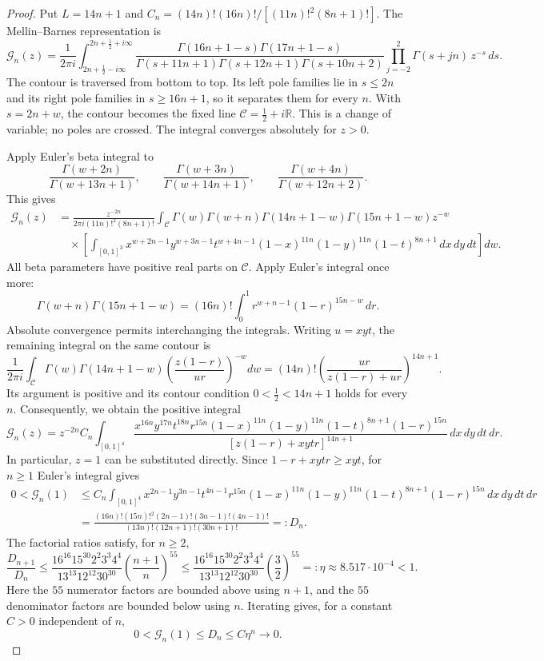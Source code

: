 \begin{proof}
Put $L=14n+1$ and $C_n=(14n)!(16n)!/[(11n)!^2(8n+1)!]$.
The Mellin--Barnes representation \cite[Eq.~16.17.1]{NIST:DLMF} is
\[
\mathcal{G}_n(z)=\frac{1}{2\pi i}
\int_{2n+\frac12-i\infty}^{2n+\frac12+i\infty}
\frac{
 \Gamma(16n+1-s)\Gamma(17n+1-s)
}{
 \Gamma(s+11n+1)\Gamma(s+12n+1)\Gamma(s+10n+2)
}\prod_{j=-2}^{2}\Gamma(s+jn)\,z^{-s}\,ds.
\]
The contour is traversed from bottom to top. Its left pole families
lie in $s\leq2n$ and its right pole families in $s\geq16n+1$,
so it separates them for every $n$.
With $s=2n+w$, the contour becomes the fixed line
$\mathcal C=\tfrac12+i\mathbb R$.
This is a change of variable; no poles are crossed.
The integral converges absolutely for $z>0$.

Apply Euler's beta integral \cite[Eq.~5.12.1]{NIST:DLMF} to
\[
\frac{\Gamma(w+2n)}{\Gamma(w+13n+1)},\qquad
\frac{\Gamma(w+3n)}{\Gamma(w+14n+1)},\qquad
\frac{\Gamma(w+4n)}{\Gamma(w+12n+2)}.
\]
This gives
\[
\begin{aligned}
\mathcal{G}_n(z)
&=\frac{z^{-2n}}{2\pi i(11n)!^2(8n+1)!}
\int_{\mathcal C}
\Gamma(w)\Gamma(w+n)\Gamma(14n+1-w)\Gamma(15n+1-w)z^{-w}\\
&\quad\times\left[\int_{[0,1]^3}
x^{w+2n-1}y^{w+3n-1}t^{w+4n-1}
(1-x)^{11n}(1-y)^{11n}(1-t)^{8n+1}
\,dx\,dy\,dt\right]dw.
\end{aligned}
\]
All beta parameters have positive real parts on $\mathcal C$.
Apply Euler's integral once more:
\[
\Gamma(w+n)\Gamma(15n+1-w)
=(16n)!\int_0^1 r^{w+n-1}(1-r)^{15n-w}\,dr.
\]
Absolute convergence permits interchanging the integrals.
Writing $u=xyt$, the remaining integral on the same contour is
\cite[Eq.~5.13.1]{NIST:DLMF}
\[
\frac{1}{2\pi i}\int_{\mathcal C}
\Gamma(w)\Gamma(14n+1-w)
\left(\frac{z(1-r)}{ur}\right)^{-w}dw
=(14n)!\left(\frac{ur}{z(1-r)+ur}\right)^{14n+1}.
\]
Its argument is positive and its contour condition
$0<\tfrac12<14n+1$ holds for every $n$.
Consequently, we obtain the positive integral
\[
\mathcal{G}_n(z)=z^{-2n}C_n\int_{[0,1]^4}
\frac{
x^{16n}y^{17n}t^{18n}r^{15n}
(1-x)^{11n}(1-y)^{11n}(1-t)^{8n+1}(1-r)^{15n}
}{[z(1-r)+xytr]^{14n+1}}
\,dx\,dy\,dt\,dr.
\]
In particular, $z=1$ can be substituted directly.
Since $1-r+xytr\geq xyt$, for $n\geq1$ Euler's integral gives
\[
\begin{aligned}
0<\mathcal{G}_n(1)
&\leq C_n\int_{[0,1]^4}
x^{2n-1}y^{3n-1}t^{4n-1}r^{15n}
(1-x)^{11n}(1-y)^{11n}(1-t)^{8n+1}(1-r)^{15n}
\,dx\,dy\,dt\,dr\\
&=\frac{(16n)!(15n)!^2(2n-1)!(3n-1)!(4n-1)!}
{(13n)!(12n+1)!(30n+1)!}
=:D_n.
\end{aligned}
\]
The factorial ratios satisfy, for $n\geq2$,
\[
\frac{D_{n+1}}{D_n}
\leq
\frac{16^{16}15^{30}2^2 3^3 4^4}{13^{13}12^{12}30^{30}}
\left(\frac{n+1}{n}\right)^{55}
\leq
\frac{16^{16}15^{30}2^2 3^3 4^4}{13^{13}12^{12}30^{30}}
\left(\frac32\right)^{55}
=:\eta\approx8.517\cdot10^{-4}<1.
\]
Here the $55$ numerator factors are bounded above using $n+1$,
and the $55$ denominator factors are bounded below using $n$.
Iterating gives, for a constant $C>0$ independent of $n$,
\[
0<\mathcal{G}_n(1)\leq D_n\leq C\eta^n\longrightarrow0.
\]


\end{proof}
